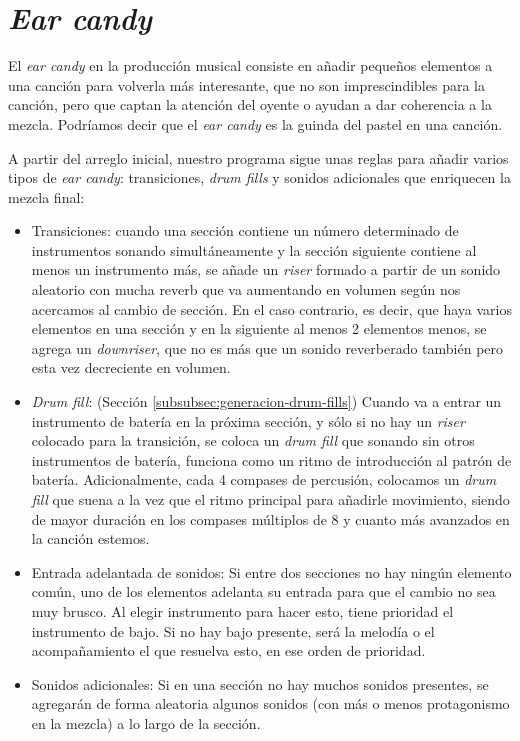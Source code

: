 \section{\textit{Ear candy}}
\label{sec:ear-candy}
El \textit{ear candy} en la producción musical consiste en añadir pequeños elementos a una canción para volverla más interesante, que no son imprescindibles para la canción, pero que captan la atención del oyente o ayudan a dar coherencia a la mezcla. Podríamos decir que el \textit{ear candy} es la guinda del pastel en una canción.

A partir del arreglo inicial, nuestro programa sigue unas reglas para añadir varios tipos de \textit{ear candy}: transiciones, \textit{drum fills} y sonidos adicionales que enriquecen la mezcla final:


\begin{itemize}

\item Transiciones: cuando una sección contiene un número determinado de instrumentos sonando simultáneamente y la sección siguiente contiene al menos un instrumento más, se añade un \textit{riser} formado a partir de un sonido aleatorio con mucha reverb que va aumentando en volumen según nos acercamos al cambio de sección. En el caso contrario, es decir, que haya varios elementos en una sección y en la siguiente al menos 2 elementos menos, se agrega un \textit{downriser}, que no es más que un sonido reverberado también pero esta vez decreciente en volumen.

\item \textit{Drum fill}: (Sección \ref{subsubsec:generacion-drum-fills}) Cuando va a entrar un instrumento de batería en la próxima sección, y sólo si no hay un \textit{riser} colocado para la transición, se coloca un \textit{drum fill} que sonando sin otros instrumentos de batería, funciona como un ritmo de introducción al patrón de batería. Adicionalmente, cada 4 compases de percusión, colocamos un \textit{drum fill} que suena a la vez que el ritmo principal para añadirle movimiento, siendo de mayor duración en los compases múltiplos de 8 y cuanto más avanzados en la canción estemos.

\item  Entrada adelantada de sonidos: Si entre dos secciones no hay ningún elemento común, uno de los elementos adelanta su entrada para que el cambio no sea muy brusco. Al elegir instrumento para hacer esto, tiene prioridad el instrumento de bajo. Si no hay bajo presente, será la melodía o el acompañamiento el que resuelva esto, en ese orden de prioridad.

\item  Sonidos adicionales: Si en una sección no hay muchos sonidos presentes, se agregarán de forma aleatoria algunos sonidos (con más o menos protagonismo en la mezcla) a lo largo de la sección.

\end{itemize}



